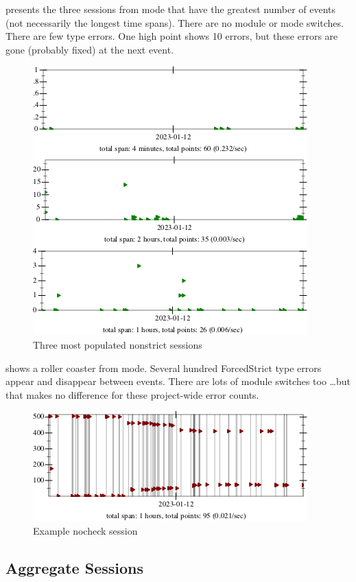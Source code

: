 \documentclass[english,submission,cleveref]{programming}
\begin{document}
 presents the three sessions from \mnonstrict{} mode
that have the greatest number of events (not necessarily the longest time spans).
There are no module or mode switches.
There are few type errors.
One high point shows 10 errors, but these errors are gone (probably fixed) at
the next event.

\begin{figure}[t]
  \includegraphics[width=0.7\columnwidth]{img/example-session-nonstrict.pdf}
  \caption{Three most populated nonstrict sessions}
  \label{f:ex-session-nonstrict}
\end{figure}

 shows a roller coaster from \mnocheck{} mode.
Several hundred ForcedStrict type errors appear and disappear between events.
There are lots of module switches too \ldots but that makes no difference
for these project-wide error counts.

\begin{figure}[t]
  \includegraphics[width=0.7\columnwidth]{img/example-session-nocheck.pdf}
  \caption{Example nocheck session}
  \label{f:ex-session-nocheck}
\end{figure}


\subsection{Aggregate Sessions}
\end{document}
